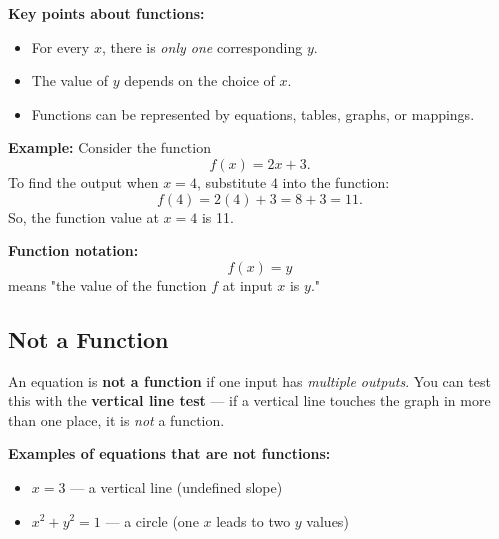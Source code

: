\documentclass[11pt]{article}
\begin{document}
\textbf{Key points about functions:}
\begin{itemize}
  \item For every \( x \), there is \emph{only one} corresponding \( y \).
  \item The value of \( y \) depends on the choice of \( x \).
  \item Functions can be represented by equations, tables, graphs, or mappings.
\end{itemize}

\bigskip

\textbf{Example:} Consider the function
\[
f(x) = 2x + 3.
\]
To find the output when \( x = 4 \), substitute \( 4 \) into the function:
\[
f(4) = 2(4) + 3 = 8 + 3 = 11.
\]
So, the function value at \( x = 4 \) is 11.

\bigskip

\textbf{Function notation:}
\[
f(x) = y
\]
means "the value of the function \( f \) at input \( x \) is \( y \)."


\subsection{Not a Function}

An equation is \textbf{not a function} if one input has \emph{multiple outputs}. You can test this with the \textbf{vertical line test} — if a vertical line touches the graph in more than one place, it is \emph{not} a function.

\textbf{Examples of equations that are not functions:}
\begin{itemize}
  \item \( x = 3 \) — a vertical line (undefined slope)
  \item \( x^2 + y^2 = 1 \) — a circle (one \( x \) leads to two \( y \) values)
\end{itemize}

\begin{center}
\end{center}
\end{document}
